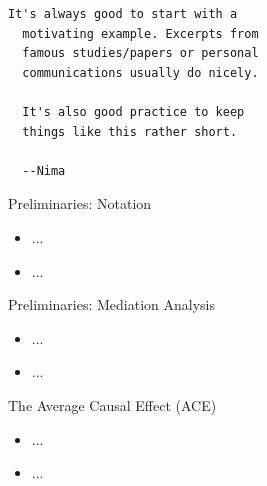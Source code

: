 \documentclass[12pt,t,handout]{beamer}
\begin{document}
\begin{frame}[fragile,c]{}

\begin{center}
\begin{minipage}[c]{9.3cm}
\begin{semiverbatim}
\lstset{basicstyle=\normalsize}
\begin{lstlisting}[linewidth=9.3cm]
  It's always good to start with a
  motivating example. Excerpts from
  famous studies/papers or personal
  communications usually do nicely.

  It's also good practice to keep
  things like this rather short.

  --Nima
\end{lstlisting}
\end{semiverbatim}
\end{minipage}
\end{center}

\end{frame}



\begin{frame}[c]{Preliminaries: Notation}

\begin{center}
\begin{itemize}
  \item ...
  \item ...
\end{itemize}
\end{center}


\end{frame}



\begin{frame}[c]{Preliminaries: Mediation Analysis}

\begin{center}
\begin{itemize}
  \item ...
  \item ...
\end{itemize}
\end{center}


\end{frame}



\begin{frame}[c]{The Average Causal Effect (ACE)}

\begin{center}
\begin{itemize}
  \item ...
  \item ...
\end{itemize}
\end{center}


\end{frame}
\end{document}
